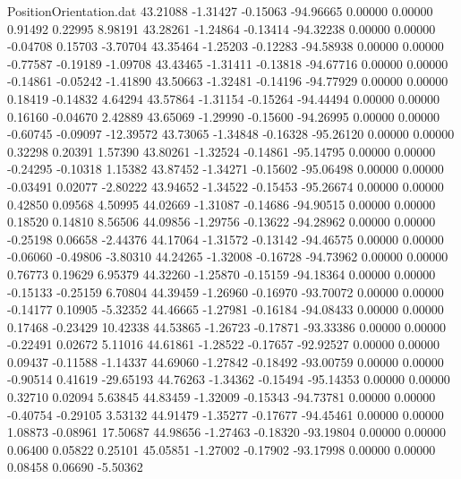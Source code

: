 \begin{filecontents}{PositionOrientation.dat}
  43.21088   -1.31427   -0.15063   -94.96665    0.00000    0.00000    0.91492    0.22995    8.98191
  43.28261   -1.24864   -0.13414   -94.32238    0.00000    0.00000   -0.04708    0.15703   -3.70704
  43.35464   -1.25203   -0.12283   -94.58938    0.00000    0.00000   -0.77587   -0.19189   -1.09708
  43.43465   -1.31411   -0.13818   -94.67716    0.00000    0.00000   -0.14861   -0.05242   -1.41890
  43.50663   -1.32481   -0.14196   -94.77929    0.00000    0.00000    0.18419   -0.14832    4.64294
  43.57864   -1.31154   -0.15264   -94.44494    0.00000    0.00000    0.16160   -0.04670    2.42889
  43.65069   -1.29990   -0.15600   -94.26995    0.00000    0.00000   -0.60745   -0.09097  -12.39572
  43.73065   -1.34848   -0.16328   -95.26120    0.00000    0.00000    0.32298    0.20391    1.57390
  43.80261   -1.32524   -0.14861   -95.14795    0.00000    0.00000   -0.24295   -0.10318    1.15382
  43.87452   -1.34271   -0.15602   -95.06498    0.00000    0.00000   -0.03491    0.02077   -2.80222
  43.94652   -1.34522   -0.15453   -95.26674    0.00000    0.00000    0.42850    0.09568    4.50995
  44.02669   -1.31087   -0.14686   -94.90515    0.00000    0.00000    0.18520    0.14810    8.56506
  44.09856   -1.29756   -0.13622   -94.28962    0.00000    0.00000   -0.25198    0.06658   -2.44376
  44.17064   -1.31572   -0.13142   -94.46575    0.00000    0.00000   -0.06060   -0.49806   -3.80310
  44.24265   -1.32008   -0.16728   -94.73962    0.00000    0.00000    0.76773    0.19629    6.95379
  44.32260   -1.25870   -0.15159   -94.18364    0.00000    0.00000   -0.15133   -0.25159    6.70804
  44.39459   -1.26960   -0.16970   -93.70072    0.00000    0.00000   -0.14177    0.10905   -5.32352
  44.46665   -1.27981   -0.16184   -94.08433    0.00000    0.00000    0.17468   -0.23429   10.42338
  44.53865   -1.26723   -0.17871   -93.33386    0.00000    0.00000   -0.22491    0.02672    5.11016
  44.61861   -1.28522   -0.17657   -92.92527    0.00000    0.00000    0.09437   -0.11588   -1.14337
  44.69060   -1.27842   -0.18492   -93.00759    0.00000    0.00000   -0.90514    0.41619  -29.65193
  44.76263   -1.34362   -0.15494   -95.14353    0.00000    0.00000    0.32710    0.02094    5.63845
  44.83459   -1.32009   -0.15343   -94.73781    0.00000    0.00000   -0.40754   -0.29105    3.53132
  44.91479   -1.35277   -0.17677   -94.45461    0.00000    0.00000    1.08873   -0.08961   17.50687
  44.98656   -1.27463   -0.18320   -93.19804    0.00000    0.00000    0.06400    0.05822    0.25101
  45.05851   -1.27002   -0.17902   -93.17998    0.00000    0.00000    0.08458    0.06690   -5.50362

\end{filecontents}
